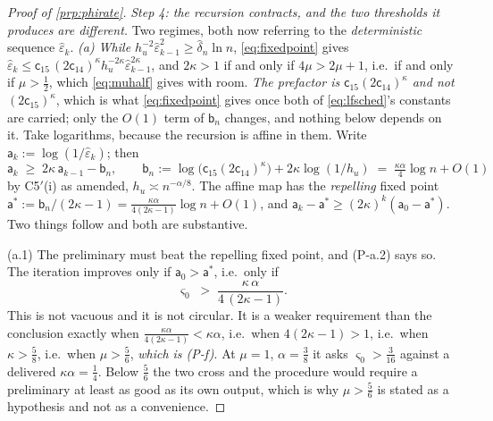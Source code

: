 \begin{proof}[Proof of \cref{prp:phirate}]
\emph{Step 4: the recursion contracts, and the two thresholds it produces are different.} Two regimes,
both now referring to the \emph{deterministic} sequence $\hat\varepsilon_k$.
\emph{(a) While $h_u^{-2}\hat\varepsilon_{k-1}^{2}\ge\hat\delta_n\ln n$}, \eqref{eq:fixedpoint}
gives $\hat\varepsilon_k\le\mathsf c_{15}\,(2\mathsf c_{14})^{\kappa}h_u^{-2\kappa}\hat\varepsilon_{k-1}^{2\kappa}$,
and $2\kappa>1$ if and only if $4\mu>2\mu+1$, i.e.\ if and only if $\mu>\tfrac12$, which
\eqref{eq:muhalf} gives with room. \emph{The prefactor is $\mathsf c_{15}(2\mathsf c_{14})^{\kappa}$
and not $(2\mathsf c_{15})^{\kappa}$}, which is what \eqref{eq:fixedpoint} gives once both of
\eqref{eq:lfsched}'s constants are carried; only the $O(1)$ term of $\mathsf b_n$ changes, and nothing
below depends on it. Take logarithms, because the recursion is affine in them.
Write $\mathsf a_k:=\log(1/\hat\varepsilon_k)$; then
\[
\mathsf a_k\;\ge\;2\kappa\,\mathsf a_{k-1}-\mathsf b_n ,
\qquad
\mathsf b_n:=\log\big(\mathsf c_{15}(2\mathsf c_{14})^{\kappa}\big)+2\kappa\log(1/h_u)
\;=\;\tfrac{\kappa\alpha}{4}\log n+O(1)
\]
by C5$'$(i) as amended, $h_u\asymp n^{-\alpha/8}$. The affine map has the \emph{repelling} fixed point
$\mathsf a^{\ast}:=\mathsf b_n/(2\kappa-1)=\tfrac{\kappa\alpha}{4(2\kappa-1)}\log n+O(1)$, and
$\mathsf a_k-\mathsf a^{\ast}\ge(2\kappa)^{k}(\mathsf a_0-\mathsf a^{\ast})$. Two things follow
and both are substantive.

(a.1) The preliminary must beat the repelling fixed point, and (P-a.2) says so. The iteration
improves only if $\mathsf a_0>\mathsf a^{\ast}$, i.e.\ only if
\begin{equation}\label{eq:prelimrate}
\varsigma_0\;>\;\frac{\kappa\,\alpha}{4\,(2\kappa-1)} .
\end{equation}
This is not vacuous and it is not circular. It is a weaker requirement than the conclusion
exactly when $\tfrac{\kappa\alpha}{4(2\kappa-1)}<\kappa\alpha$, i.e.\ when $4(2\kappa-1)>1$, i.e.\ when
$\kappa>\tfrac58$, i.e.\ when $\mu>\tfrac56$, \emph{which is (P-f)}. At $\mu=1$, $\alpha=\tfrac38$ it
asks $\varsigma_0>\tfrac3{16}$ against a delivered $\kappa\alpha=\tfrac14$. Below $\tfrac56$ the
two cross and the procedure would require a preliminary at least as good as its own output, which is
why $\mu>\tfrac56$ is stated as a hypothesis and not as a convenience.


\end{proof}
